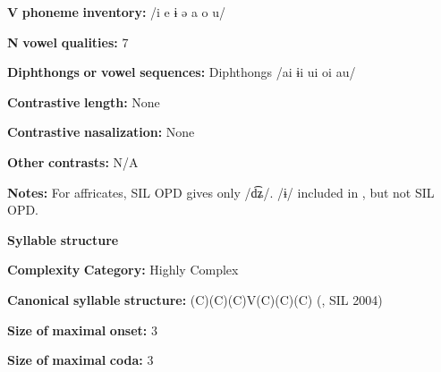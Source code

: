 \documentclass[output=paper]{langsci/langscibook}
\begin{document}
\begin{styleBody}
\textbf{V} \textbf{phoneme} \textbf{inventory:} /i e ɨ ə a o u/
\end{styleBody}

\begin{styleBody}
\textbf{N} \textbf{vowel} \textbf{qualities:} 7
\end{styleBody}

\begin{styleBody}
\textbf{Diphthongs} \textbf{or} \textbf{vowel} \textbf{sequences:} Diphthongs /ai ɨi ui oi au/
\end{styleBody}

\begin{styleBody}
\textbf{Contrastive} \textbf{length:} None
\end{styleBody}

\begin{styleBody}
\textbf{Contrastive} \textbf{nasalization:} None
\end{styleBody}

\begin{styleBody}
\textbf{Other} \textbf{contrasts:} N/A
\end{styleBody}

\begin{styleBody}
\textbf{Notes:} For affricates, SIL OPD gives only /d͡ʑ/. /ɨ/ included in \citealt{Bruce1984}, but not SIL OPD.
\end{styleBody}

\begin{styleBody}
\textbf{Syllable} \textbf{structure}
\end{styleBody}

\begin{styleBody}
\textbf{Complexity} \textbf{Category:} Highly Complex
\end{styleBody}

\begin{styleBody}
\textbf{Canonical} \textbf{syllable} \textbf{structure:} (C)(C)(C)V(C)(C)(C) (\citealt{Bruce1984}, SIL 2004)
\end{styleBody}

\begin{styleBody}
\textbf{Size} \textbf{of} \textbf{maximal} \textbf{onset:} 3
\end{styleBody}

\begin{styleBody}
\textbf{Size} \textbf{of} \textbf{maximal} \textbf{coda:} 3
\end{styleBody}
\end{document}
